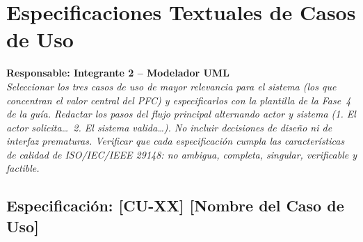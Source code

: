 \documentclass[journal,onecolumn]{IEEEtran}
\newcommand{\guia}[2]{%
  \begin{mdframed}[style=guia]
    \noindent\textbf{Responsable: #1}\\[2pt]
    \textit{#2}
  \end{mdframed}
}
\begin{document}
\section{Especificaciones Textuales de Casos de Uso}

\guia{Integrante 2 -- Modelador UML}{%
Seleccionar los tres casos de uso de mayor relevancia para el sistema
(los que concentran el valor central del PFC) y especificarlos con la
plantilla de la Fase~4 de la guía. Redactar los pasos del flujo principal
alternando actor y sistema (1. El actor solicita\ldots\ 2. El sistema
valida\ldots). No incluir decisiones de diseño ni de interfaz prematuras.
Verificar que cada especificación cumpla las características de calidad
de ISO/IEC/IEEE 29148: no ambigua, completa, singular, verificable y factible.}

\subsection{Especificación: [CU-XX] [Nombre del Caso de Uso]}
\end{document}

